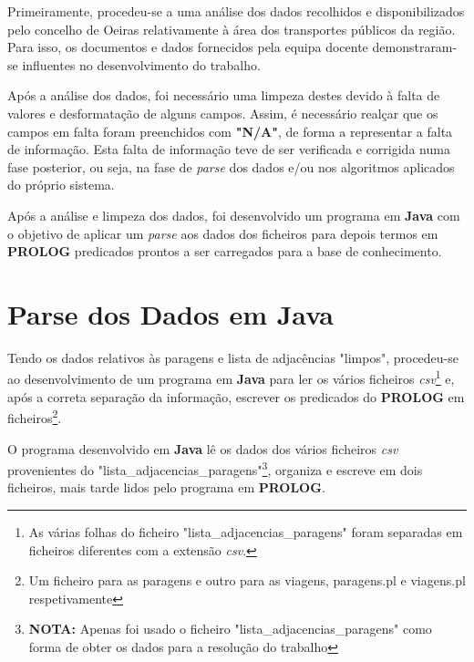 \documentclass[a4paper,12pt]{report}
\begin{document}
Primeiramente, procedeu-se a uma análise dos dados recolhidos e disponibilizados pelo concelho de Oeiras relativamente à área dos transportes públicos da região. Para isso, os documentos e dados fornecidos pela equipa docente demonstraram-se influentes no desenvolvimento do trabalho.
\par Após a análise dos dados, foi necessário uma limpeza destes devido à falta de valores e desformatação de alguns campos. Assim, é necessário realçar que os campos em falta foram preenchidos com \textbf{"N/A"}, de forma a representar a falta de informação. Esta falta de informação teve de ser verificada e corrigida numa fase posterior, ou seja, na fase de \textit{parse} dos dados e/ou nos algoritmos aplicados do próprio sistema.

\vspace{0.3cm}

\par Após a análise e limpeza dos dados, foi desenvolvido um programa em \textbf{Java} com o objetivo de aplicar um \textit{parse} aos dados dos ficheiros para depois termos em \textbf{PROLOG} predicados prontos a ser carregados para a base de conhecimento.

\vspace{20cm}

\section{Parse dos Dados em Java}

Tendo os dados relativos às paragens e lista de adjacências "limpos", procedeu-se ao desenvolvimento de um programa em \textbf{Java} para ler os vários ficheiros \textit{csv}\footnote{As várias folhas do ficheiro "lista\_adjacencias\_paragens"\hspace{0.0001cm} foram separadas em ficheiros diferentes com a extensão \textit{csv}.} e, após a correta separação da informação, escrever os predicados do \textbf{PROLOG} em ficheiros\footnote{Um ficheiro para as paragens e outro para as viagens, paragens.pl e viagens.pl respetivamente}. 

\par O programa desenvolvido em \textbf{Java} lê os dados dos vários ficheiros \textit{csv} provenientes do "lista\_adjacencias\_paragens"\footnote{\textbf{NOTA:} Apenas foi usado o ficheiro "lista\_adjacencias\_paragens" como forma de obter os dados para a resolução do trabalho}, organiza e escreve em dois ficheiros, mais tarde lidos pelo programa em \textbf{PROLOG}.
\end{document}
